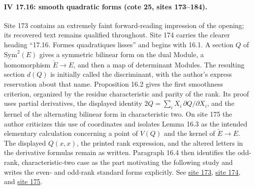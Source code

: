 \documentclass[10pt,a4paper]{article}
\begin{document}
\par{}
\paragraph{IV 17.16: smooth quadratic forms (cote 25, sites 173--184).}
Site 173 contains an extremely faint forward-reading impression of the opening; its recovered text remains qualified throughout. Site 174 carries the clearer heading ``17.16. Formes quadratiques lisses'' and begins with 16.1. A section \(Q\) of \(\underline{\mathrm{Sym}}^2(E)\) gives a symmetric bilinear form on the dual Module, a homomorphism \(\check E\longrightarrow E\), and then a map of determinant Modules. The resulting section \(d(Q)\) is initially called the discriminant, with the author's express reservation about that name. Proposition 16.2 gives the first smoothness criterion, organized by the residue characteristic and parity of the rank. Its proof uses partial derivatives, the displayed identity \(2Q=\sum_i X_i\,\partial Q/\partial X_i\), and the kernel of the alternating bilinear form in characteristic two. On site 175 the author criticizes this use of coordinates and isolates Lemma 16.3 as the intended elementary calculation concerning a point of \(V(Q)\) and the kernel of \(\check E\longrightarrow E\). The displayed \(Q(x,x)\), the printed rank expression, and the altered letters in the derivative formulas remain as written. Paragraph 16.4 then identifies the odd-rank, characteristic-two case as the part motivating the following study and writes the even- and odd-rank standard forms explicitly. See \href{https://grothendieck.umontpellier.fr/web/viewer.html?file=../25.pdf#page=174}{site 173}, \href{https://grothendieck.umontpellier.fr/web/viewer.html?file=../25.pdf#page=175}{site 174}, and \href{https://grothendieck.umontpellier.fr/web/viewer.html?file=../25.pdf#page=176}{site 175}.
\end{document}
